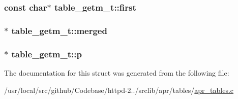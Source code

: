 \subsubsection[{\texorpdfstring{first}{first}}]{\setlength{\rightskip}{0pt plus 5cm}const char$\ast$ table\+\_\+getm\+\_\+t\+::first}\hypertarget{structtable__getm__t_ad94d941ffa782520abf0f6507f81edd9}{}\label{structtable__getm__t_ad94d941ffa782520abf0f6507f81edd9}
\subsubsection[{\texorpdfstring{merged}{merged}}]{$\ast$ table\+\_\+getm\+\_\+t\+::merged}\hypertarget{structtable__getm__t_a1c57a4920f4f0de0b9777a1e5584c084}{}\label{structtable__getm__t_a1c57a4920f4f0de0b9777a1e5584c084}
\subsubsection[{\texorpdfstring{p}{p}}]{$\ast$ table\+\_\+getm\+\_\+t\+::p}\hypertarget{structtable__getm__t_a41552a64f15e1c1b8b1687b3a9648d02}{}\label{structtable__getm__t_a41552a64f15e1c1b8b1687b3a9648d02}


The documentation for this struct was generated from the following file\+:\begin{DoxyCompactItemize}
\item 
/usr/local/src/github/\+Codebase/httpd-\/2../srclib/apr/tables/\hyperlink{apr__tables_8c}{apr\+\_\+tables.\+c}\end{DoxyCompactItemize}
